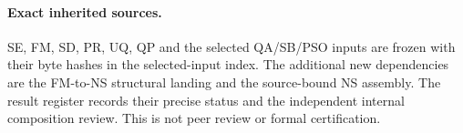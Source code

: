\paragraph{Exact inherited sources.}
SE, FM, SD, PR, UQ, QP and the selected QA/SB/PSO inputs are frozen
with their byte hashes in the selected-input index. The additional
new dependencies are the FM-to-NS structural landing and the
source-bound NS assembly. The result register records their precise
status and the independent internal composition review. This is
not peer review or formal certification.
